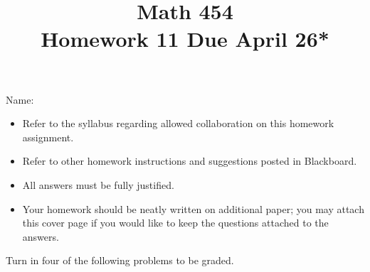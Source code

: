 \documentclass[11pt]{amsart}%
\begin{document}
\title{Math 454\\ Homework 11 %
\qquad Due April 26*%
}
\author{}
\date{}
\maketitle
\thispagestyle{empty}


\noindent Name:~\hrulefill~~\\

\begin{itemize}
\item Refer to the syllabus regarding allowed collaboration on this homework assignment.
\item Refer to other homework instructions and suggestions posted in Blackboard.
\item All answers must be fully justified.
\item Your homework should be neatly written on additional paper; you may attach this cover page if you would like to keep the questions attached to the answers.
\end{itemize}

\bigskip
Turn in four of the following problems to be graded.
\bigskip
\end{document}

